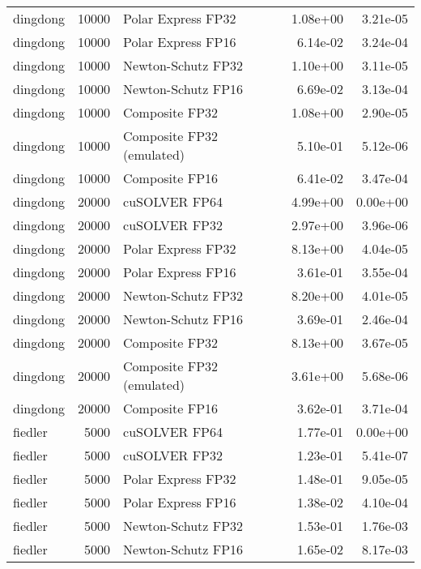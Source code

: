 \begin{table}
\begin{tabular}{lrlrr}
 dingdong & 10000 &        Polar Express FP32 &  1.08e+00 &        3.21e-05 \\
 dingdong & 10000 &        Polar Express FP16 &  6.14e-02 &        3.24e-04 \\
 dingdong & 10000 &        Newton-Schutz FP32 &  1.10e+00 &        3.11e-05 \\
 dingdong & 10000 &        Newton-Schutz FP16 &  6.69e-02 &        3.13e-04 \\
 dingdong & 10000 &            Composite FP32 &  1.08e+00 &        2.90e-05 \\
 dingdong & 10000 & Composite FP32 (emulated) &  5.10e-01 &        5.12e-06 \\
 dingdong & 10000 &            Composite FP16 &  6.41e-02 &        3.47e-04 \\
 dingdong & 20000 &             cuSOLVER FP64 &  4.99e+00 &        0.00e+00 \\
 dingdong & 20000 &             cuSOLVER FP32 &  2.97e+00 &        3.96e-06 \\
 dingdong & 20000 &        Polar Express FP32 &  8.13e+00 &        4.04e-05 \\
 dingdong & 20000 &        Polar Express FP16 &  3.61e-01 &        3.55e-04 \\
 dingdong & 20000 &        Newton-Schutz FP32 &  8.20e+00 &        4.01e-05 \\
 dingdong & 20000 &        Newton-Schutz FP16 &  3.69e-01 &        2.46e-04 \\
 dingdong & 20000 &            Composite FP32 &  8.13e+00 &        3.67e-05 \\
 dingdong & 20000 & Composite FP32 (emulated) &  3.61e+00 &        5.68e-06 \\
 dingdong & 20000 &            Composite FP16 &  3.62e-01 &        3.71e-04 \\
  fiedler &  5000 &             cuSOLVER FP64 &  1.77e-01 &        0.00e+00 \\
  fiedler &  5000 &             cuSOLVER FP32 &  1.23e-01 &        5.41e-07 \\
  fiedler &  5000 &        Polar Express FP32 &  1.48e-01 &        9.05e-05 \\
  fiedler &  5000 &        Polar Express FP16 &  1.38e-02 &        4.10e-04 \\
  fiedler &  5000 &        Newton-Schutz FP32 &  1.53e-01 &        1.76e-03 \\
  fiedler &  5000 &        Newton-Schutz FP16 &  1.65e-02 &        8.17e-03 \\

\end{tabular}
\end{table}
